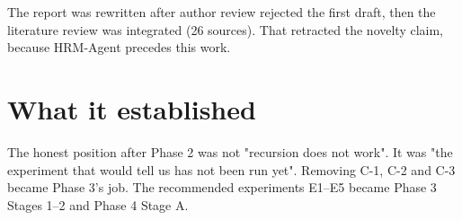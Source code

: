 \documentclass[11pt]{article}
\begin{document}
The report was rewritten after author review rejected the first draft, then the literature review was integrated (26 sources). That retracted the novelty claim, because HRM-Agent precedes this work.



\section*{What it established}



The honest position after Phase 2 was not "recursion does not work". It was "the experiment that would tell us has not been run yet". Removing C-1, C-2 and C-3 became Phase 3's job. The recommended experiments E1--E5 became Phase 3 Stages 1--2 and Phase 4 Stage A.
\end{document}
